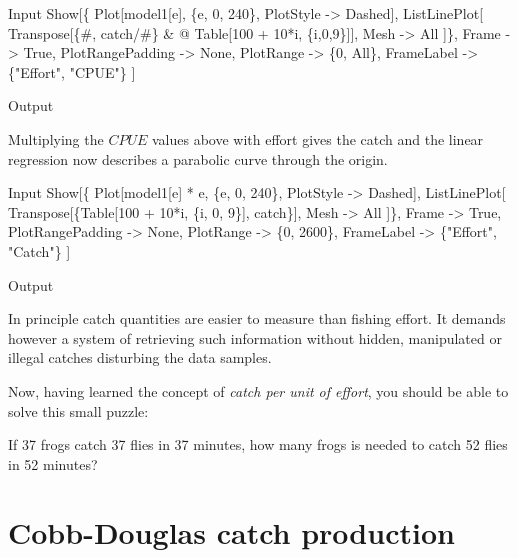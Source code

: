 \documentclass[11pt,fleqn]{book} %
\begin{document}
\begin{theorem}
\begin{mmaCell}{Input}
  Show[\{
    Plot[model1[e], \{e, 0, 240\}, PlotStyle -> Dashed],
    ListLinePlot[
      Transpose[\{#, catch/#\} & @ Table[100 + 10*i, \{i,0,9\}]], 
      Mesh -> All
    ]\}, 
    Frame            -> True, 
    PlotRangePadding -> None,
    PlotRange        -> \{0, All\}, 
    FrameLabel       -> \{"Effort", "CPUE"\}
  ]
\end{mmaCell}
\begin{mmaCell}[moregraphics={moreig={scale=.7}}]{Output}
\end{mmaCell}
Multiplying the $CPUE$ values above with effort gives the catch and the linear regression now describes a parabolic curve through the origin.
\begin{mmaCell}{Input}
  Show[\{
    Plot[model1[e] * e, \{e, 0, 240\}, PlotStyle -> Dashed],
    ListLinePlot[
      Transpose[\{Table[100 + 10*i, \{i, 0, 9\}], catch\}],
      Mesh -> All
    ]\}, 
    Frame            -> True, 
    PlotRangePadding -> None,
    PlotRange        -> \{0, 2600\}, 
    FrameLabel       -> \{"Effort", "Catch"\}
  ]
\end{mmaCell}
\begin{mmaCell}[moregraphics={moreig={scale=.7}}]{Output}
\end{mmaCell}
\label{code:cobbdouglas3}
\end{theorem}

In principle catch quantities are easier to measure than fishing effort. It demands however a system of retrieving such information without hidden, manipulated or illegal catches disturbing the data samples.

\begin{corollary}
\hfill \break
\small{Now, having learned the concept of \textit{catch per unit of effort}, you should be able to solve this small puzzle:

If 37 frogs catch 37 flies in 37 minutes, how many frogs is needed to catch 52 flies in 52 minutes?

}
\label{highlight:frogsandflies}
\end{corollary}

\section{Cobb-Douglas catch production}
\end{document}
